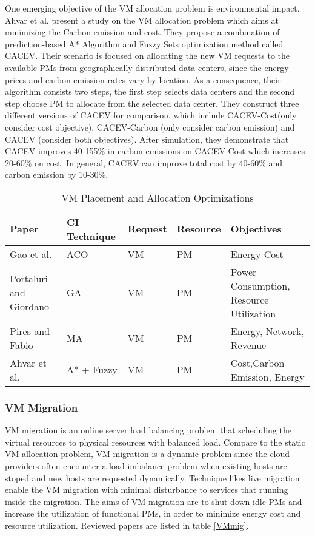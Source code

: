 \documentclass[onecolumn,10pt]{asme2ej}
\begin{document}
One emerging objective of the VM allocation problem is environmental impact. Ahvar et al. \cite{ahvar2016cacev} present a study on the VM allocation problem which aims at minimizing the Carbon emission and cost. They propose a combination of prediction-based A* Algorithm and Fuzzy Sets optimization method called CACEV. Their scenario is focused on allocating the new VM requests to the available PMs from geographically distributed data centers, since the energy prices and carbon emission rates vary by location. As a consequence, their algorithm consists two steps, the first step selects data centers and the second step choose PM to allocate from the selected data center. They construct three different versions of CACEV for comparison, which include CACEV-Cost(only consider cost objective), CACEV-Carbon (only consider carbon emission) and CACEV (consider both objectives). After simulation, they demonstrate that CACEV improves 40-155\% in carbon emissions on CACEV-Cost which increases 20-60\% on cost. In general, CACEV can improve total cost by 40-60\% and carbon emission by 10-30\%.
\begin{table}[H]
\begin{center}
\begin{tabular}[b]{|l|llll}
\rowcolor[gray]{.4}
\color{white}Paper    							  & \color{white}CI Technique & \color{white}Request     & \color{white}Resource    &\color{white}Objectives  \\ \hline 
Gao et al. \cite{gao2016energy}                   & ACO      				  & VM              		 & PM 						&Energy Cost  \\ \hline
Portaluri and  Giordano \cite{portaluri2016multi} & GA       				  & VM       				 & PM 						&Power Consumption, Resource Utilization\\ \hline
Pires and Fabio \cite{pires2013multi}        	  & MA     			          & VM  			         & PM  						&Energy, Network, Revenue   \\ \hline
Ahvar et al. \cite{ahvar2016cacev}				  & A* + Fuzzy 				  & VM                       & PM  			        	&Cost,Carbon Emission, Energy\\
\end{tabular}
\end{center}
\caption{VM Placement and Allocation Optimizations}
\label{VMallo}
\end{table}

\subsubsection{VM Migration}
VM migration is an online server load balancing problem that scheduling the virtual resources to physical resources with balanced load. Compare to the static VM allocation problem, VM migration is a dynamic problem since the cloud providers often encounter a load imbalance problem when existing hosts are stoped and new hosts are requested dynamically. Technique likes live migration enable the VM migration with minimal disturbance to services that running inside the migration. The aims of VM migration are to 
shut down idle PMs and increase the utilization of functional PMs, in order to minimize energy cost and resource utilization. Reviewed papers are listed in table \ref{VMmig}.
\end{document}
